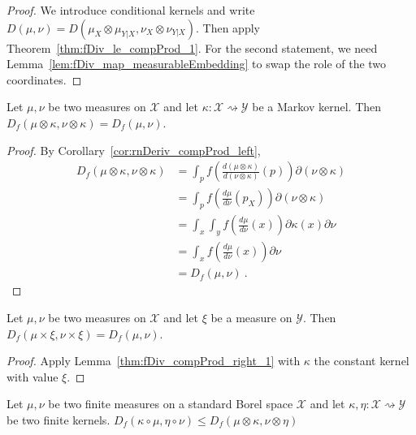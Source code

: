 \begin{proof}\leanok
{}
We introduce conditional kernels and write $D(\mu, \nu) = D(\mu_X \otimes \mu_{Y|X}, \nu_X \otimes \nu_{Y|X})$. Then apply Theorem~\ref{thm:fDiv_le_compProd_1}.
For the second statement, we need Lemma~\ref{lem:fDiv_map_measurableEmbedding} to swap the role of the two coordinates.
\end{proof}

\begin{lemma}
  \label{thm:fDiv_compProd_right_1}
  \leanok
  Let $\mu, \nu$ be two measures on $\mathcal X$ and let $\kappa : \mathcal X \rightsquigarrow \mathcal Y$ be a Markov kernel.
  Then $D_f(\mu \otimes \kappa, \nu \otimes \kappa) = D_f(\mu, \nu)$.
\end{lemma}

\begin{proof}\leanok
{}
By Corollary~\ref{cor:rnDeriv_compProd_left},
\begin{align*}
D_f(\mu \otimes \kappa, \nu \otimes \kappa)
&= \int_{p} f\left(\frac{d (\mu \otimes \kappa)}{d (\nu \otimes \kappa)}(p)\right) \partial(\nu \otimes \kappa)
\\
&= \int_{p} f\left(\frac{d \mu}{d \nu}(p_X)\right) \partial(\nu \otimes \kappa)
\\
&= \int_x \int_y f\left(\frac{d \mu}{d \nu}(x)\right) \partial \kappa(x) \partial \nu
\\
&= \int_x f\left(\frac{d \mu}{d \nu}(x)\right) \partial \nu
\\
&= D_f(\mu, \nu)
\: .
\end{align*}
\end{proof}

\begin{corollary}
  \label{cor:fDiv_prod_right_1}
  Let $\mu, \nu$ be two measures on $\mathcal X$ and let $\xi$ be a measure on $\mathcal Y$.
  Then $D_f(\mu \times \xi, \nu \times \xi) = D_f(\mu, \nu)$.
\end{corollary}

\begin{proof}
Apply Lemma~\ref{thm:fDiv_compProd_right_1} with $\kappa$ the constant kernel with value $\xi$.
\end{proof}

\begin{lemma}
  \label{lem:fDiv_comp_le_compProd_1}
  \leanok
  Let $\mu, \nu$ be two finite measures on a standard Borel space $\mathcal X$ and let $\kappa, \eta : \mathcal X \rightsquigarrow \mathcal Y$ be two finite kernels.
  $D_f(\kappa \circ \mu, \eta \circ \nu) \le D_f(\mu \otimes \kappa, \nu \otimes \eta)$
\end{lemma}

